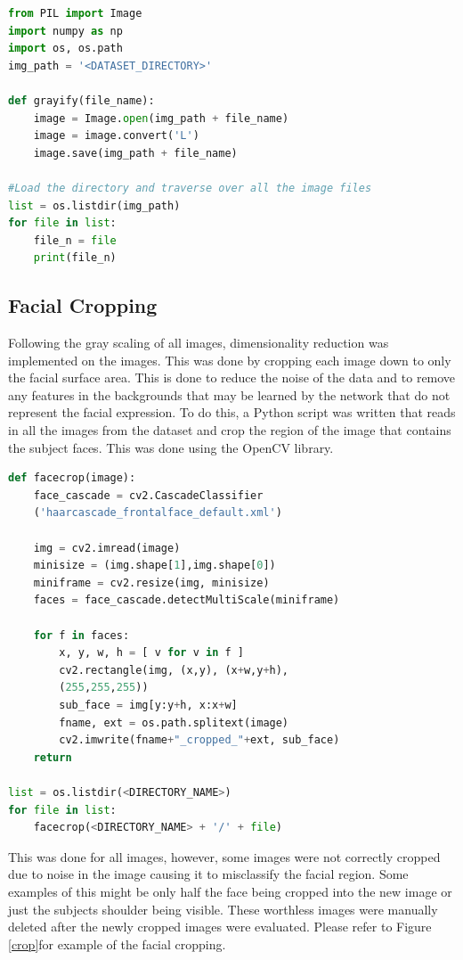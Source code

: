 \begin{lstlisting}[language=Python, frame=single]
from PIL import Image
import numpy as np
import os, os.path
img_path = '<DATASET_DIRECTORY>' 

def grayify(file_name):
	image = Image.open(img_path + file_name)
	image = image.convert('L')
	image.save(img_path + file_name)

#Load the directory and traverse over all the image files
list = os.listdir(img_path)
for file in list:
	file_n = file
	print(file_n)

\end{lstlisting}

\subsection{Facial Cropping}
Following the gray scaling of all images, dimensionality reduction was implemented on the images. This was done by cropping each image down to only the facial surface area. This is done to reduce the noise of the data and to remove any features in the backgrounds that may be learned by the network that do not represent the facial expression. To do this, a Python script was written that reads in all the images from the dataset and crop the region of the image that contains the subject faces. This was done using the OpenCV library.

\begin{lstlisting}[language=Python, frame=single]
def facecrop(image):
	face_cascade = cv2.CascadeClassifier
	('haarcascade_frontalface_default.xml')
	
	img = cv2.imread(image)
	minisize = (img.shape[1],img.shape[0])
	miniframe = cv2.resize(img, minisize)
	faces = face_cascade.detectMultiScale(miniframe)
	
	for f in faces:
		x, y, w, h = [ v for v in f ]
		cv2.rectangle(img, (x,y), (x+w,y+h),
		(255,255,255))
		sub_face = img[y:y+h, x:x+w]
		fname, ext = os.path.splitext(image)
		cv2.imwrite(fname+"_cropped_"+ext, sub_face)
	return

list = os.listdir(<DIRECTORY_NAME>)
for file in list:
	facecrop(<DIRECTORY_NAME> + '/' + file)
\end{lstlisting}
\newpage
This was done for all images, however, some images were not correctly cropped due to noise in the image causing it to misclassify the facial region. Some examples of this might be only half the face being cropped into the new image or just the subjects shoulder being visible. These worthless images were manually deleted after the newly cropped images were evaluated. Please refer to Figure \ref{crop}for example of the facial cropping.

